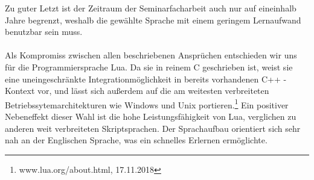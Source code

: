 Zu guter Letzt ist der Zeitraum der Seminarfacharbeit auch nur auf eineinhalb Jahre begrenzt, weshalb die gewählte Sprache mit einem geringem Lernaufwand benutzbar sein muss.\\\\
Als Kompromiss zwischen allen beschriebenen Ansprüchen entschieden wir uns für die Programmiersprache Lua. Da sie in reinem C geschrieben ist, weist sie eine uneingeschränkte Integrationmöglichkeit in bereits vorhandenen C++ - Kontext vor, und lässt sich außerdem auf die am weitesten verbreiteten Betriebssytemarchitekturen wie Windows und Unix portieren.\footnote{www.lua.org/about.html, 17.11.2018} Ein positiver Nebeneffekt dieser Wahl ist die hohe Leistungsfähigkeit von Lua, verglichen zu anderen weit verbreiteten Skriptsprachen. Der Sprachaufbau orientiert sich sehr nah an der Englischen Sprache, was ein schnelles Erlernen ermöglichte.


